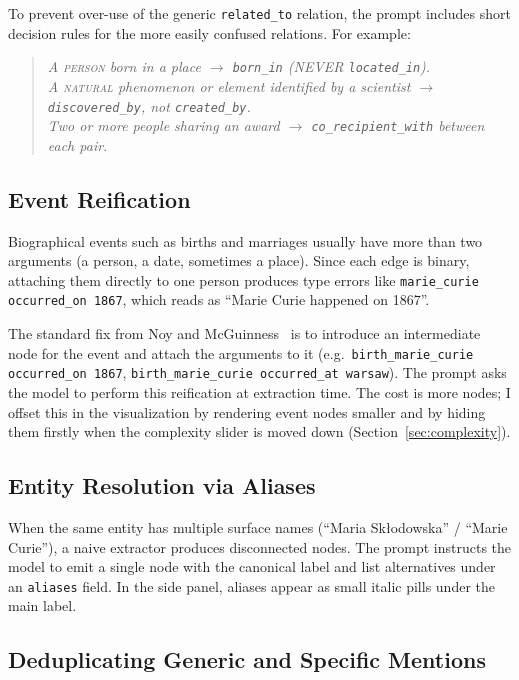 \documentclass[11pt,a4paper]{article}
\begin{document}
To prevent over-use of the generic \texttt{related\_to} relation, the prompt includes short decision rules for the more easily confused relations. For example:

\begin{quote}\small\itshape
A \textsc{person} born in a place $\rightarrow$ \texttt{born\_in} (NEVER \texttt{located\_in}).\\
A \textsc{natural} phenomenon or element identified by a scientist $\rightarrow$ \texttt{discovered\_by}, not \texttt{created\_by}.\\
Two or more people sharing an award $\rightarrow$ \texttt{co\_recipient\_with} between each pair.
\end{quote}

\subsection{Event Reification}\label{sec:reification}

Biographical events such as births and marriages usually have more than two arguments (a person, a date, sometimes a place). Since each edge is binary, attaching them directly to one person produces type errors like \texttt{marie\_curie occurred\_on 1867}, which reads as ``Marie Curie happened on 1867''.

The standard fix from Noy and McGuinness~\cite{noy2001ontology} is to introduce an intermediate node for the event and attach the arguments to it (e.g.\  \texttt{birth\_marie\_curie occurred\_on 1867},
\texttt{birth\_marie\_curie occurred\_at warsaw}). The prompt asks the model to perform this reification at extraction time. The cost is more nodes; I offset this in the visualization by rendering event nodes smaller and by hiding them firstly when the complexity slider is moved down (Section~\ref{sec:complexity}).

\subsection{Entity Resolution via Aliases}\label{sec:aliases}

When the same entity has multiple surface names (``Maria Sk\l odowska'' / ``Marie Curie''), a naive extractor produces disconnected nodes. The prompt instructs the model to emit a single node with the canonical label and list alternatives under an \texttt{aliases} field. In the side panel, aliases appear as small italic pills under the main label.

\subsection{Deduplicating Generic and Specific Mentions}
\end{document}
